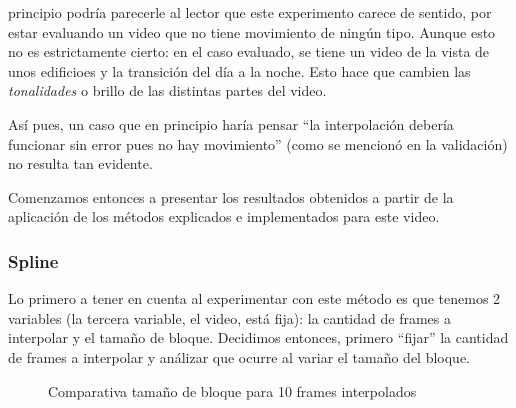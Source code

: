  principio podría parecerle al lector que este experimento
carece de sentido, por estar evaluando un video que no tiene
movimiento de ning\'un tipo. Aunque esto no es estrictamente cierto: en el caso evaluado, se tiene
un video de la vista de unos edificioes y la transici\'on del d\'ia a la noche.
Esto hace que cambien las \emph{tonalidades} o brillo de las distintas partes del video.

As\'i pues, un caso que en principio har\'ia pensar ``la
interpolaci\'on deber\'ia funcionar sin error pues no hay movimiento''
(como se mencion\'o en la validación) no resulta tan evidente.

Comenzamos entonces a presentar los resultados obtenidos a partir de la
aplicaci\'on de los m\'etodos explicados e implementados para este video.

\subsubsection{Spline}\label{subsubsec:fija-fija_spline}
\par Lo primero a tener en cuenta al experimentar con este m\'etodo es que
tenemos 2 variables (la tercera variable, el video, est\'a fija): la cantidad
de frames a interpolar y el tama\~no de bloque. Decidimos entonces, primero
``fijar'' la cantidad de frames a interpolar y an\'alizar que ocurre al variar
el tama\~no del bloque.

\begin{figure}[H]
    \centering
    \caption{Comparativa tama\~no de bloque para 10 frames interpolados}
    \label{fig:fija-fija_spline-bloques}
\end{figure}

